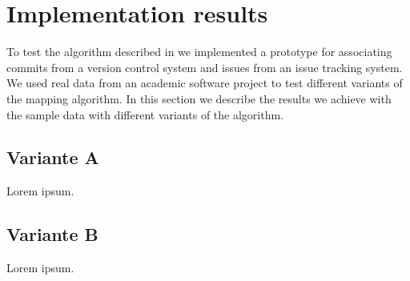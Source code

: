 \section{Implementation results}
\label{sec:implementation_results}
To test the algorithm described in  we implemented a prototype for associating commits from a version control system and issues from an issue tracking system.
We used real data from an academic software project to test different variants of the mapping algorithm.
In this section we describe the results we achieve with the sample data with different variants of the algorithm.

\subsection{Variante A} 
Lorem ipsum.

\subsection{Variante B}
Lorem ipsum.